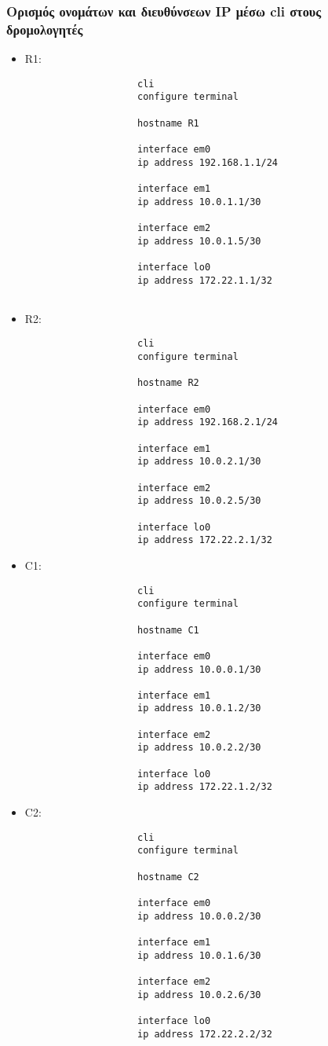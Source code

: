 \documentclass[a4paper, 12pt]{article}
\begin{document}
	\subsubsection*{Ορισμός ονομάτων και διευθύνσεων IP μέσω cli στους δρομολογητές}
		\begin{itemize}
			\item R1:
				\begin{verbatim}
					cli
					configure terminal 
					
					hostname R1
					
					interface em0 
					ip address 192.168.1.1/24
					
					interface em1 
					ip address 10.0.1.1/30
					
					interface em2
					ip address 10.0.1.5/30
					
					interface lo0
					ip address 172.22.1.1/32
					
				\end{verbatim}
			
			\item R2:	
				\begin{verbatim}
					cli
					configure terminal 
					
					hostname R2
					
					interface em0
					ip address 192.168.2.1/24
					
					interface em1
					ip address 10.0.2.1/30
					
					interface em2
					ip address 10.0.2.5/30
					
					interface lo0
					ip address 172.22.2.1/32
				\end{verbatim}
				
			\item C1:
				\begin{verbatim}
					cli
					configure terminal 
					
					hostname C1
					
					interface em0
					ip address 10.0.0.1/30
					
					interface em1
					ip address 10.0.1.2/30
					
					interface em2
					ip address 10.0.2.2/30
					
					interface lo0
					ip address 172.22.1.2/32
				\end{verbatim}
				
			\item C2:
				\begin{verbatim}
					cli
					configure terminal 
					
					hostname C2
					
					interface em0
					ip address 10.0.0.2/30
					
					interface em1
					ip address 10.0.1.6/30
					
					interface em2
					ip address 10.0.2.6/30
					
					interface lo0
					ip address 172.22.2.2/32	
				\end{verbatim}		
		\end{itemize}
	
\end{document}
